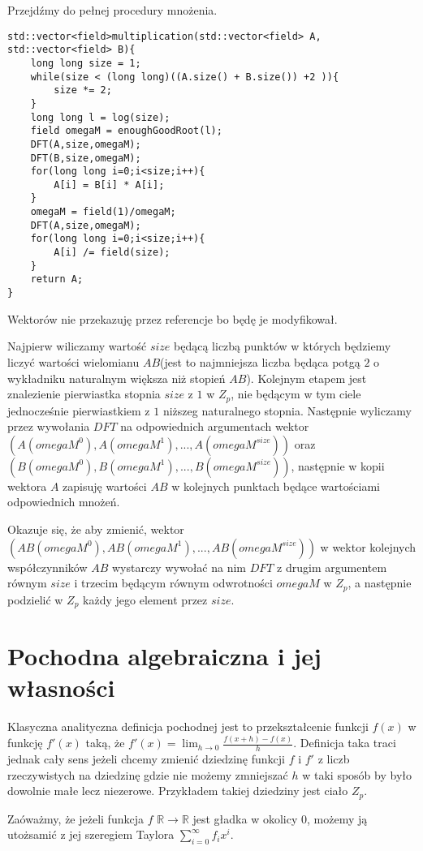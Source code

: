 \documentclass{article}
\begin{document}
Przejdźmy do pełnej procedury mnożenia. 
\begin{lstlisting}
std::vector<field>multiplication(std::vector<field> A, std::vector<field> B){
    long long size = 1;
    while(size < (long long)((A.size() + B.size()) +2 )){
        size *= 2;
    }
    long long l = log(size);
    field omegaM = enoughGoodRoot(l);
    DFT(A,size,omegaM);  
    DFT(B,size,omegaM);
    for(long long i=0;i<size;i++){
        A[i] = B[i] * A[i]; 
    }
    omegaM = field(1)/omegaM;
    DFT(A,size,omegaM);
    for(long long i=0;i<size;i++){
        A[i] /= field(size);
    } 
    return A;
}
\end{lstlisting}
Wektorów nie przekazuję przez referencje bo będę je modyfikował.

Najpierw wiliczamy wartość $size$ będącą liczbą punktów w których będziemy liczyć wartości wielomianu $AB$(jest to najmniejsza liczba będąca potgą 
$2$ o wykładniku naturalnym większa niż stopień $AB$). Kolejnym etapem jest znalezienie pierwiastka stopnia $size$ z $1$ w $Z_p$, nie będącym w tym ciele jednocześnie pierwiastkiem 
z $1$ niższeg naturalnego stopnia. Następnie wyliczamy przez wywołania $DFT$ na odpowiednich argumentach wektor $(A(omegaM^0),A(omegaM^1),...,A(omegaM^{size}))$ oraz
$(B(omegaM^0),B(omegaM^1),...,B(omegaM^{size}))$, następnie w kopii wektora $A$ zapisuję wartości $AB$ w kolejnych punktach będące wartościami odpowiednich 
mnożeń.

Okazuje się, że aby zmienić, wektor $(AB(omegaM^0),AB(omegaM^1),...,AB(omegaM^{size}))$ w wektor kolejnych współczynników $AB$ wystarczy wywołać na nim $DFT$ z drugim argumentem równym $size$ i trzecim 
będącym równym odwrotności $omegaM$ w $Z_p$, a następnie podzielić w $Z_p$ każdy jego element przez $size$. 

\section{Pochodna algebraiczna i jej własności}
Klasyczna analityczna definicja pochodnej jest to przekształcenie funkcji $f(x)$ w funkcję $f'(x)$ taką, że
$f'(x)=\lim_{h \to 0}\frac{f(x+h)-f(x)}{h}$. Definicja taka traci jednak cały sens jeżeli chcemy zmienić dziedzinę
funkcji $f$ i $f'$ z liczb rzeczywistych na dziedzinę gdzie nie możemy zmniejszać $h$ w taki sposób by było 
dowolnie małe lecz niezerowe. Przykładem takiej dziedziny jest ciało $Z_p$. 

Zaóważmy, że jeżeli funkcja $f$ $\mathbb{R}\to \mathbb{R}$ jest gładka w okolicy $0$, możemy ją utożsamić z jej szeregiem Taylora $\sum_{i=0}^{\infty}f_ix^i$. 
\end{document}
